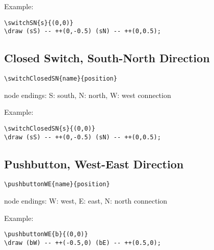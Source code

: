 \documentclass[parskip=full]{scrartcl}
\begin{document}
Example:\\
\begin{minipage}{0.8\textwidth}
\begin{verbatim}
\switchSN{s}{(0,0)}
\draw (sS) -- ++(0,-0.5) (sN) -- ++(0,0.5);
\end{verbatim}
\end{minipage}
\begin{minipage}{0.19\textwidth}
\end{minipage}

\subsection{Closed Switch, South-North Direction}

\begin{verbatim}
\switchClosedSN{name}{position}
\end{verbatim}
node endings: S: south, N: north, W: west connection

Example:\\
\begin{minipage}{0.8\textwidth}
\begin{verbatim}
\switchClosedSN{s}{(0,0)}
\draw (sS) -- ++(0,-0.5) (sN) -- ++(0,0.5);
\end{verbatim}
\end{minipage}
\begin{minipage}{0.19\textwidth}
\end{minipage}

\subsection{Pushbutton, West-East Direction}

\begin{verbatim}
\pushbuttonWE{name}{position}
\end{verbatim}
node endings: W: west, E: east, N: north connection

Example:\\
\begin{minipage}{0.8\textwidth}
\begin{verbatim}
\pushbuttonWE{b}{(0,0)}
\draw (bW) -- ++(-0.5,0) (bE) -- ++(0.5,0);
\end{verbatim}
\end{minipage}
\begin{minipage}{0.19\textwidth}
\end{minipage}
\end{document}
